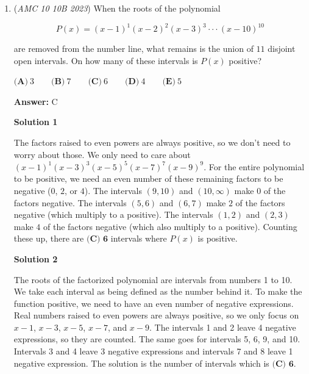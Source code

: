 \begin{enumerate}
 \begin{verbatim}
Suzanne could have received \mathbf{$21$} different collections of bills.
\end{verbatim}


solution: 21

 -YOOFUSABD -spent his whole day originally creating this solution

 


	\item (\textit{AMC 10 10B 2023}) When the roots of the polynomial 


 
 \[P(x)  = (x-1)^1 (x-2)^2 (x-3)^3 \cdot \cdot \cdot (x-10)^{10}\]


 are removed from the number line, what remains is the union of $11$ disjoint open intervals. On how many of these intervals is $P(x)$ positive?


 $\textbf{(A)}~3\qquad\textbf{(B)}~7\qquad\textbf{(C)}~6\qquad\textbf{(D)}~4\qquad\textbf{(E)}~5$

 \textbf{Answer: }C



\textbf{Solution 1}

The factors raised to even powers are always positive, so we don't need to worry about those. We only need to care about $(x-1)^1(x-3)^3(x-5)^5(x-7)^7(x-9)^9$. For the entire polynomial to be positive, we need an even number of these remaining factors to be negative ($0$, $2$, or $4$). The intervals $(9, 10)$ and $(10, \infty)$ make $0$ of the factors negative. The intervals $(5, 6)$ and $(6, 7)$ make $2$ of the factors negative (which multiply to a positive). The intervals $(1, 2)$ and $(2, 3)$ make $4$ of the factors negative (which also multiply to a positive). Counting these up, there are $\boxed{\textbf{(C) 6}}$ intervals where $P(x)$ is positive.

 



\textbf{Solution 2}

The roots of the factorized polynomial are intervals from numbers 1 to 10. We take each interval as being defined as the number behind it. To make the function positive, we need to have an even number of negative expressions. Real numbers raised to even powers are always positive, so we only focus on $x-1$, $x-3$, $x-5$, $x-7$, and $x-9$. The intervals 1 and 2 leave 4 negative expressions, so they are counted. The same goes for intervals 5, 6, 9, and 10. Intervals 3 and 4 leave 3 negative expressions and intervals 7 and 8 leave 1 negative expression. The solution is the number of intervals which is $\boxed{\textbf{(C) 6}}$.


\end{enumerate}
